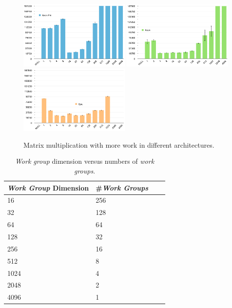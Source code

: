 \begin{figure}[!h]
    \centering
    \includegraphics[width=0.49\textwidth]{figures/opt1_phi.png}
    \includegraphics[width=0.49\textwidth]{figures/opt1_cpu.png}
    \includegraphics[width=0.49\textwidth]{figures/opt1_gpu.png}
    \caption{Matrix multiplication with more work in different architectures.}
    \label{MoreWork}
\end{figure}

\begin{table}[!h]
    \centering
    \begin{tabular}{| l | l | l | l |}
    \hline
    \emph{Work Group} Dimension & \#\emph{Work Groups} \\ \hline
    16 & 256 \\ \hline
    32 & 128 \\ \hline
    64 & 64 \\ \hline
    128 & 32 \\ \hline
    256 & 16 \\ \hline
    512 & 8 \\ \hline
    1024 & 4 \\ \hline
    2048 & 2 \\ \hline
    4096 & 1 \\ 
    \hline
    \end{tabular}
    \caption{\emph{Work group} dimension versus numbers of \emph{work groups}.}
    \label{tab:work_groups}
\end{table}

